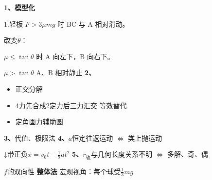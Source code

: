 \textbf{1、模型化}

1.轻板
$F>3\mu mg$ 时 BC 与 A 相对滑动。

改变$\theta$：

$\mu\le\tan\theta$ 时 A 向左下，B 向右下。 %

$\mu>\tan\theta$ A、B 相对静止 %
\textbf{2、}
\begin{itemize}
\item 正交分解
\item 4力\quad 先合成2定力\quad 后三力汇交 \quad 等效替代
\item 定角\quad 画力\quad 辅助圆
\end{itemize}
\textbf{3、}代值、极限法
\textbf{4、}$a$恒定往返运动 $\Leftrightarrow$ 类上抛运动

↓带正负\quad $x=v_0t-\frac12at^2$ %
\textbf{5、}$r_{\text{轨}}$与几何长度关系不明 $\Leftrightarrow$ 多解、奇、偶

$f$的双向性
\textbf{整体法}
宏观视角：每个球受$\frac13mg$

